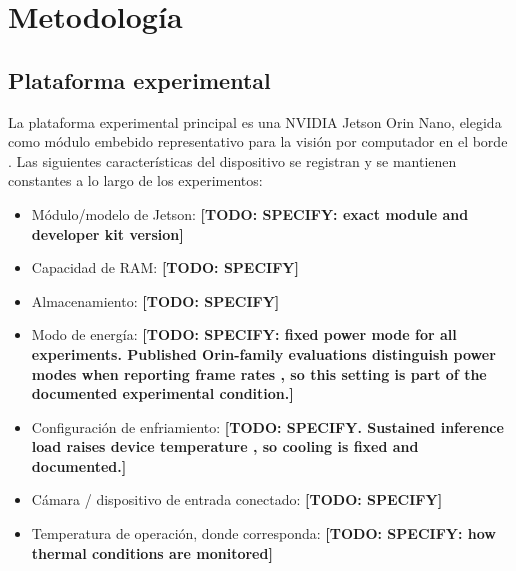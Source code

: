 %

\providecommand{\todo}[1]{\textbf{[TODO: #1]}}

\chapter{Metodología}
\label{chap:methodology}

\section{Plataforma experimental}
\label{sec:platform}

La plataforma experimental principal es una NVIDIA Jetson Orin Nano,
elegida como módulo embebido representativo para la visión por computador
en el borde \cite{scalcon2024, alqahtani2026}. Las siguientes
características del dispositivo se registran y se mantienen constantes a lo
largo de los experimentos:

\begin{itemize}
  \item Módulo/modelo de Jetson: \todo{SPECIFY: exact module and developer
        kit version}
  \item Capacidad de RAM: \todo{SPECIFY}
  \item Almacenamiento: \todo{SPECIFY}
  \item Modo de energía: \todo{SPECIFY: fixed power mode for all
        experiments. Published Orin-family evaluations distinguish power
        modes when reporting frame rates \cite{scalcon2024}, so this
        setting is part of the documented experimental condition.}
  \item Configuración de enfriamiento: \todo{SPECIFY. Sustained inference
        load raises device temperature \cite{zequn2026}, so cooling is
        fixed and documented.}
  \item Cámara / dispositivo de entrada conectado: \todo{SPECIFY}
  \item Temperatura de operación, donde corresponda: \todo{SPECIFY: how
        thermal conditions are monitored}
\end{itemize}

